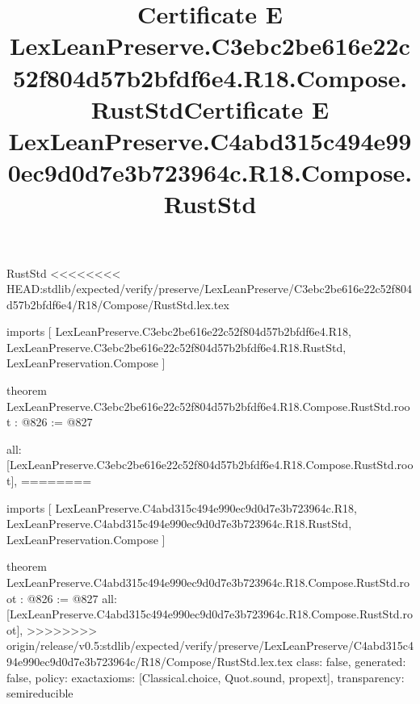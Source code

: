 \begin{lexlean}{RustStd}
<<<<<<<< HEAD:stdlib/expected/verify/preserve/LexLeanPreserve/C3ebc2be616e22c52f804d57b2bfdf6e4/R18/Compose/RustStd.lex.tex
\title{Certificate E LexLeanPreserve.C3ebc2be616e22c52f804d57b2bfdf6e4.R18.Compose.RustStd}
\begin{coremodule}
imports [
  LexLeanPreserve.C3ebc2be616e22c52f804d57b2bfdf6e4.R18,
  LexLeanPreserve.C3ebc2be616e22c52f804d57b2bfdf6e4.R18.RustStd,
  LexLeanPreservation.Compose
]

theorem LexLeanPreserve.C3ebc2be616e22c52f804d57b2bfdf6e4.R18.Compose.RustStd.root : @826 := @827 {
  all: [LexLeanPreserve.C3ebc2be616e22c52f804d57b2bfdf6e4.R18.Compose.RustStd.root],
========
\title{Certificate E LexLeanPreserve.C4abd315c494e990ec9d0d7e3b723964c.R18.Compose.RustStd}
\begin{coremodule}
imports [
  LexLeanPreserve.C4abd315c494e990ec9d0d7e3b723964c.R18,
  LexLeanPreserve.C4abd315c494e990ec9d0d7e3b723964c.R18.RustStd,
  LexLeanPreservation.Compose
]

theorem LexLeanPreserve.C4abd315c494e990ec9d0d7e3b723964c.R18.Compose.RustStd.root : @826 := @827 {
  all: [LexLeanPreserve.C4abd315c494e990ec9d0d7e3b723964c.R18.Compose.RustStd.root],
>>>>>>>> origin/release/v0.5:stdlib/expected/verify/preserve/LexLeanPreserve/C4abd315c494e990ec9d0d7e3b723964c/R18/Compose/RustStd.lex.tex
  class: false,
  generated: false,
  policy: exact{axioms: [Classical.choice, Quot.sound, propext]},
  transparency: semireducible
}


\end{coremodule}}
\end{coremodule}
\end{lexlean}
